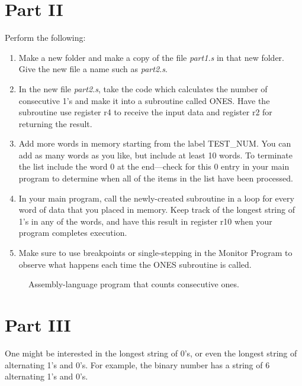 \documentclass[epsfig,10pt,fullpage]{article}
\begin{document}
\section*{Part II}
Perform the following:
\begin{enumerate}
\item Make a new folder and make a copy of the file {\it part1.s} in that new folder. Give
the new file a name such as {\it part2.s}.
\item In the new file {\it part2.s}, take the code which calculates the 
number of consecutive 1's and make it into a subroutine called ONES. Have the subroutine use 
register r4 to receive the input data and register r2 for returning the result.
\item Add more words in memory starting from the label TEST\_NUM. You can add as many
words as you like, but include at least 10 words. To terminate the list include the word 0
at the end---check for this 0 entry in your main program to determine when all of the
items in the list have been processed.
\item In your main program, call the newly-created subroutine in a loop for every word of 
data that you placed in memory. Keep track of the longest string of 1's in any of the words, 
and have this result in register r10 when your program completes execution. 
\item Make sure to use breakpoints or single-stepping in the Monitor Program to observe what 
happens each time the ONES subroutine is called.
\end{enumerate}

\begin{figure}[H]
\begin{center}

\end{center}
\caption{Assembly-language program that counts consecutive ones.}
\label{fig:code}
\end{figure}

\newpage
\section*{Part III}
One might be interested in the longest string of 0's, or even the longest string of
alternating 1's and 0's. For example, the binary number {} has a string of 
6 alternating 1's and 0's.
\end{document}
